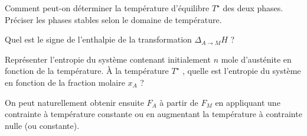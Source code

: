 \begin{exercise}
\begin{questions}
\question Comment peut-on déterminer la température d'équilibre $T^\star$ des deux phases. Préciser les phases stables selon le domaine de température.

\question Quel est le signe de l'enthalpie de la transformation $\Delta_{A \to M} H$ ?

\question Représenter l'entropie du système contenant initialement $n$ mole d'austénite en fonction de la température. \`{A} la température $T^\star$ , quelle est l'entropie du système en fonction de la fraction molaire $x_A$ ?
\end{questions}

On peut naturellement obtenir ensuite $F_A$ à partir de $F_M$ en appliquant une contrainte à température constante ou en augmentant la température à contrainte nulle (ou constante).

\end{exercise}